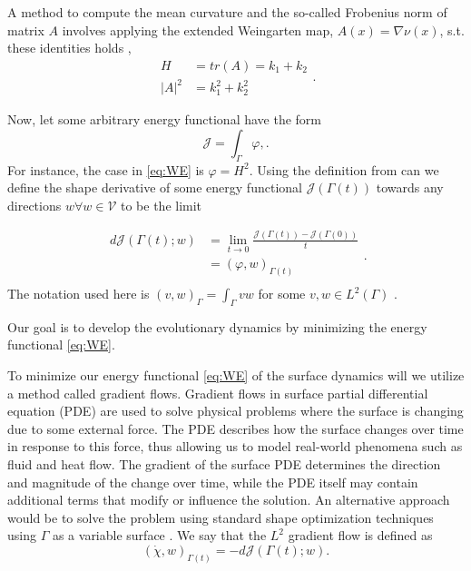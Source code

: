 A method to compute the mean curvature and the so-called Frobenius norm of matrix $A$ involves applying the
extended Weingarten map, $ A\left( x \right) = \nabla \nu \left( x \right) $, s.t. these identities holds \cite{kovacs2021convergent},
\begin{equation*}
    \begin{split}
    H & = tr(A) = k_{1} + k_{2} \\
    \left\lvert A \right\rvert^{2}  & = k_{1}^2 + k_{2}^2
    \end{split}
.\end{equation*}

Now, let some arbitrary energy functional have the form
\[
\mathcal{J} = \int_{\Gamma }^{} \varphi,.
\]
For instance, the case in \eqref{eq:WE} is $\varphi = H ^2$.
Using the definition from \cite{bonito2010parametric, troltzsch2010optimal} can we define the shape derivative of some energy
functional $\mathcal{J} \left( \Gamma \left( t \right)  \right)  $ towards any directions $ w \forall w \in \mathcal{V}  $  to be the limit

\begin{equation*}
    \begin{split}
d\mathcal{J} \left( \Gamma \left( t \right) ; w  \right)  & = \lim_{t \to 0} \frac{\mathcal{J}\left( \Gamma \left( t \right)  \right) - \mathcal{J} (  \Gamma \left( 0 \right))}{t} \\
&= \left(  \varphi ,w\right)_{\Gamma \left( t \right) }  \\
    \end{split}
.\end{equation*}
 The notation used here is $\left( v,w \right)_{\Gamma } = \int_{\Gamma }^{}  vw   $ for some $ v,w \in L^{2}\left( \Gamma \right) $ .

Our goal is to develop the evolutionary dynamics by minimizing the energy functional \eqref{eq:WE}.

To minimize our energy functional \eqref{eq:WE} of the surface dynamics will we utilize a method called gradient flows. Gradient flows in surface partial differential equation (PDE) are used to solve physical problems where the surface is changing due to some external force. The PDE describes how the surface changes over time in response to this force, thus allowing us to model real-world phenomena such as fluid and heat flow. The gradient of the surface PDE determines the direction and magnitude of the change over time, while the PDE itself may contain additional terms that modify or influence the solution. \cite{dogan2007discrete} An alternative approach would be to solve the problem using standard shape optimization techniques using $\Gamma$ as a variable surface \cite{dalphin2014study}.
We say that the $L^{2}$  gradient flow is defined as
\[
\left( \dot{\chi } , w \right)_{\Gamma \left( t \right)  } = -d\mathcal{J}\left( \Gamma \left( t \right); w  \right).
\]




